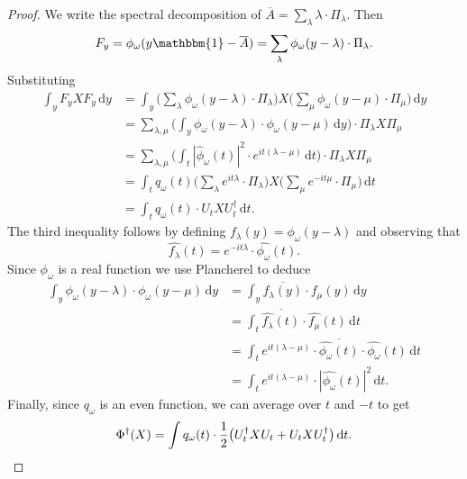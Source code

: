 \documentclass[10pt]{article}
\newcommand{\luders}{\Phi}
\newcommand{\Id}{\mathbbm{1}}
\newcommand{\lift}[1]{\overline{#1}}
\begin{document}
\begin{proof}
    We write the spectral decomposition of $\lift{A} = \sum_{\lambda} \lambda\cdot \Pi_{\lambda}$.
    Then
    \begin{equation*}
        F_y = \phi_{\omega}(y\Id - \lift{A})
        = \sum_{\lambda} \phi_{\omega}(y - \lambda) \cdot \Pi_{\lambda}.
    \end{equation*}
    Substituting
    \begin{align*}
        \int_y F_y X F_y\,\mathrm{d}y 
        &= \int_y \big(\sum_{\lambda} \phi_{\omega}(y - \lambda) \cdot \Pi_{\lambda}\big) X \big(\sum_{\mu} \phi_{\omega}(y - \mu) \cdot \Pi_{\mu}\big)\,\mathrm{d}y \\
        &= \sum_{\lambda, \mu} \Big(\int_y \phi_{\omega}(y - \lambda) \cdot \phi_{\omega}(y - \mu)\,\mathrm{d}y \Big) \cdot \Pi_{\lambda} X \Pi_{\mu} \\
        &= \sum_{\lambda, \mu} \Big(\int_t |\widehat{\phi}_\omega(t)|^2 \cdot e^{it(\lambda-\mu)}\,\mathrm{d}t \Big) \cdot \Pi_{\lambda} X \Pi_{\mu} \\
        &= \int_t q_\omega(t) \Big(\sum_{\lambda} e^{it\lambda} \cdot \Pi_{\lambda} \Big) X \Big(\sum_{\mu} e^{-it\mu} \cdot \Pi_{\mu} \Big) \,\mathrm{d}t \\
        &= \int_t q_\omega(t) \cdot U_t X U_t^{\dagger} \,\mathrm{d}t.
    \end{align*}
    The third inequality follows by defining $f_{\lambda}(y) = \phi_{\omega}(y - \lambda)$ and observing that
    \begin{equation*}
        \widehat{f_{\lambda}}(t) = e^{-it\lambda} \cdot \widehat{\phi_{\omega}}(t).
    \end{equation*}
    Since $\phi_{\omega}$ is a real function we use Plancherel to deduce
    \begin{align}
        \int_y \phi_{\omega}(y - \lambda) \cdot \phi_{\omega}(y - \mu)\,\mathrm{d}y
        &= \int_y \overline{f_{\lambda}(y)} \cdot f_{\mu}(y)\,\mathrm{d}y \\
        &= \int_t \overline{\widehat{f_{\lambda}}(t)} \cdot \widehat{f_{\mu}}(t)\,\mathrm{d}t \\
        &= \int_t e^{it(\lambda - \mu)} \cdot \overline{\widehat{\phi_{\omega}}(t)} \cdot \widehat{\phi_{\omega}}(t)\,\mathrm{d}t \\
        &= \int_t e^{it(\lambda - \mu)} \cdot |\widehat{\phi_{\omega}}(t)|^2\,\mathrm{d}t.
    \end{align}
    Finally, since $q_\omega$ is an even function, we can average over $t$ and $-t$ to get
    \begin{equation*}
        \luders^{\dagger}(X)
        = \int q_\omega(t) \cdot \frac{1}{2} \big(U_t^{\dagger} X U_t + U_t X U_t^{\dagger}\big) \,\mathrm{d}t. \qedhere
    \end{equation*}
\end{proof}
\end{document}
